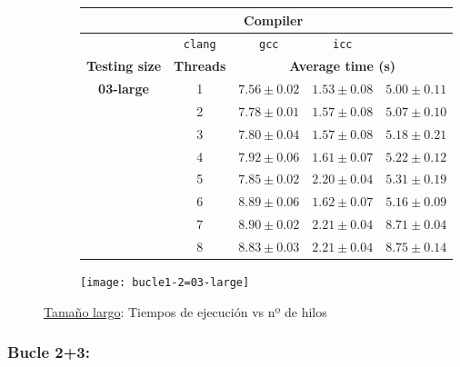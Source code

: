 \begin{figure}[H]
    \centering
    \begin{subfigure}{0.4\textwidth}
        \begin{adjustbox}{width=\textwidth} 
        \begin{tabular}{|c|c|c|c|c|}
            \hline
            \rowcolor{azul} \multicolumn{2}{|c|}{}&\multicolumn{3}{c|}{\textbf{Compiler}} \\ \hline
            \rowcolor{azul} \multicolumn{2}{|c|}{}&\texttt{clang}&\texttt{gcc}&\texttt{icc}\\ \hline
            \rowcolor{azul} \textbf{Testing size} & \textbf{Threads}&\multicolumn{3}{c|}{\textbf{Average time (s)}} \\ \hline
            \multirow{8}{1cm}{\textbf{03-large}} & 1 & \(7.56\pm{0.02}\) & \(1.53\pm{0.08}\) & \(5.00\pm{0.11}\) \\ \cline{2-5}
            & 2 & \(7.78\pm{0.01}\) & \(1.57\pm{0.08}\) & \(5.07\pm{0.10}\) \\ \cline{2-5}
            & 3 & \(7.80\pm{0.04}\) & \(1.57\pm{0.08}\) & \(5.18\pm{0.21}\) \\ \cline{2-5}
            & 4 & \(7.92\pm{0.06}\) & \(1.61\pm{0.07}\) & \(5.22\pm{0.12}\) \\ \cline{2-5}
            & 5 & \(7.85\pm{0.02}\) & \(2.20\pm{0.04}\) & \(5.31\pm{0.19}\) \\ \cline{2-5}
            & 6 & \(8.89\pm{0.06}\) & \(1.62\pm{0.07}\) & \(5.16\pm{0.09}\) \\ \cline{2-5}
            & 7 & \(8.90\pm{0.02}\) & \(2.21\pm{0.04}\) & \(8.71\pm{0.04}\) \\ \cline{2-5}
            & 8 & \(8.83\pm{0.03}\) & \(2.21\pm{0.04}\) & \(8.75\pm{0.14}\) \\ \hline
        \end{tabular}
        \end{adjustbox}
    \end{subfigure}
    \hfill
    \begin{subfigure}{0.5\textwidth}
        \texttt{[image: bucle1-2=03-large]}
    \end{subfigure}
    \caption{\underline{Tamaño largo}: Tiempos de ejecución vs nº de hilos}
    \label{bucle1-2=03-large}
\end{figure}

\subsubsection{\textbf{Bucle 2+3:}}

